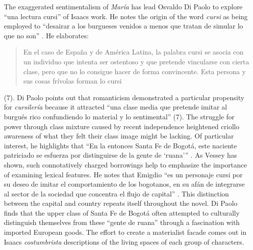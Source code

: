 The exaggerated sentimentalism of \textit{María} has lead Osvaldo Di Paolo to explore \enquote{una lectura cursi} of Isaacs work. 
He notes the origin of the word \textit{cursi} as being employed to \enquote{desairar a los burgueses venidos a menos que tratan de simular lo que no son} \autocite[7]{Paolo}. 
He elaborates: \blockquote{En el caso de España y de América Latina, la palabra cursi se asocia con un individuo que intenta ser ostentoso y que pretende vincularse con cierta clase, pero que no lo consigue hacer de forma convincente. Esta persona y sus cosas frívolas forman lo cursi} (7). 
Di Paolo points out that romanticism demonstrated a particular propensity for \textit{cursilería} because it attracted \enquote{una clase media que pretende imitar al burgués rico confundiendo lo material y lo sentimental} (7).
The struggle for power through class mixture caused by recent independence heightened criollo awareness of what they felt their class image might be lacking.
Of particular interest, he highlights that \enquote{En la entonces Santa Fe de Bogotá, este naciente patriciado se esfuerza por distinguirse de la gente de \enquote{ruana}} \autocite[8]{Paolo}. 
As Vessey has shown, such connotatively charged borrowings help to emphasize the importance of examining lexical features.
He notes that Emigdio \enquote{es un personaje cursi por su deseo de imitar el comportamiento de los bogotanos, en su afán de integrarse al sector de la sociedad que concentra el flujo de capital} \autocite[9]{Paolo}. 
This distinction between the capital and country repeats itself throughout the novel.
Di Paolo finds that the upper class of Santa Fe de Bogotá often attempted to culturally distinguish themselves from these \enquote{gente de ruana} through a fascination with imported European goods.
The effort to create a materialist facade comes out in Isaacs \textit{costumbrista} descriptions of the living spaces of each group of characters.

